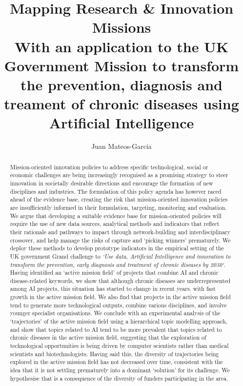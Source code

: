 \documentclass[11pt]{article}
\begin{document}
\title{%
\textbf{Mapping Research \& Innovation Missions \\
\large With an application to the UK Government Mission to transform the prevention, diagnosis and treament of chronic diseases using Artificial Intelligence}}
\author{Juan Mateos-Garcia}
\maketitle
\begin{abstract}
Mission-oriented innovation policies to address specific technological, social or economic challenges are being increasingly recognised as a promising strategy to steer innovation in societally desirable directions and encourage the formation of new disciplines and industries. The formulation of this policy agenda has however raced ahead of the evidence base, creating the risk that mission-oriented innovation policies are insufficiently informed in their formulation, targeting, monitoring and evaluation. We argue that developing a suitable evidence base for mission-oriented policies will require the use of new data sources, analytical methods and indicators that reflect their rationale and pathways to impact through network-building and interdisciplinary crossover, and help manage the risks of capture and `picking winners' prematurely. We deploy these methods to develop prototype indicators in the empirical setting of the UK government Grand challenge to \textit{`Use data, Artificial Intelligence and innovation to transform the prevention, early diagnosis and treatment of chronic diseases by 2030`}. Having identified an `active mission field' of projects that combine AI and chronic disease-related keywords, we show that although chronic diseases are underrepresented among AI projects, this situation has started to change in recent years, with fast growth in the active mission field. We also find that projects in the active mission field tend to generate more technological outputs, combine various disciplines, and involve younger specialist organisations. We conclude with an experimental analysis of the `trajectories' of the active mission field using a hierarchical topic modelling approach, and show that topics related to AI tend to be more prevalent that topics related to chronic diseases in the active mission field, suggesting that the exploration of technological opportunities is being driven by computer scientists rather than medical scientists and biotechnologists. Having said this, the diversity of trajectories being explored in the active mission field has not decreased over time, consistent with the idea that it is not settling prematurely into a dominant `solution' for its challenge. We hypothesise that is a consequence of the diversity of funders participating in the area. 
\end{abstract}
\end{document}
